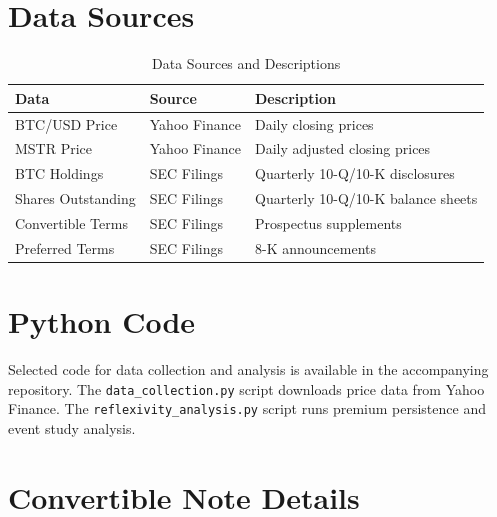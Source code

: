 \section{Data Sources}
\label{app:data}

\begin{table}[H]
\centering
\caption{Data Sources and Descriptions}
\begin{tabular}{@{}llp{6cm}@{}}
\toprule
\textbf{Data} & \textbf{Source} & \textbf{Description} \\
\midrule
BTC/USD Price & Yahoo Finance & Daily closing prices \\
MSTR Price & Yahoo Finance & Daily adjusted closing prices \\
BTC Holdings & SEC Filings & Quarterly 10-Q/10-K disclosures \\
Shares Outstanding & SEC Filings & Quarterly 10-Q/10-K balance sheets \\
Convertible Terms & SEC Filings & Prospectus supplements \\
Preferred Terms & SEC Filings & 8-K announcements \\
\bottomrule
\end{tabular}
\end{table}

\section{Python Code}
\label{app:code}

Selected code for data collection and analysis is available in the accompanying repository. The \texttt{data\_collection.py} script downloads price data from Yahoo Finance. The \texttt{reflexivity\_analysis.py} script runs premium persistence and event study analysis.

\section{Convertible Note Details}
\label{app:converts}

